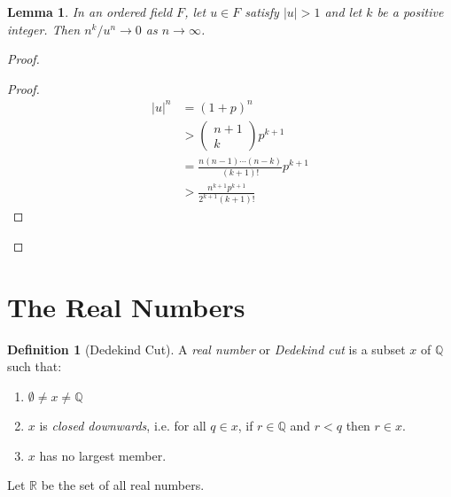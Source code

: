 \documentclass{article}
\let\qed\relax
\newtheorem{lemma}[axiom]{Lemma}
\theoremstyle{definition}
\newtheorem{definition}[axiom]{Definition}
\begin{document}
    \begin{lemma}
        In an ordered field $F$, let $u \in F$ satisfy $|u| > 1$
        and let $k$ be a positive integer. Then $n^k / u^n \rightarrow 0$
        as $n \rightarrow \infty$.
    \end{lemma}

    \begin{proof}
        \pf
        \begin{proof}
            \pf
            \begin{align*}
                |u|^n & = (1+p)^n \\
                & > \left( \begin{array}{c} n + 1 \\ k \end{array}
                \right) p^{k+1} \\
                & = \frac{n (n-1) \cdots (n-k)}{(k+1)!} p^{k+1} \\
                & > \frac{n^{k+1} p^{k+1}}{2^{k+1} (k+1)!}
            \end{align*}
        \end{proof}
        \qed
    \end{proof}
    
    \section{The Real Numbers}

    \begin{definition}[Dedekind Cut]
        A \emph{real number} or \emph{Dedekind cut} is a subset $x$ of $\mathbb{Q}$ such that:
        \begin{enumerate}
            \item $\emptyset \neq x \neq \mathbb{Q}$
            \item $x$ is \emph{closed downwards}, i.e. for all $q \in x$, if $r \in \mathbb{Q}$
            and $r < q$ then $r \in x$.
            \item $x$ has no largest member.
        \end{enumerate}
        Let $\mathbb{R}$ be the set of all real numbers.
    \end{definition}
\end{document}
